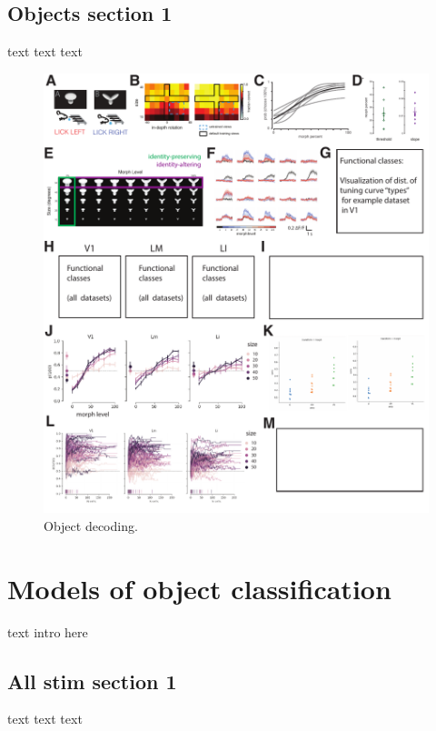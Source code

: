 \documentclass{article}
\begin{document}
\subsection{Objects section 1}
text text text

\begin{figure}[ht]
  \includegraphics[width=\textwidth]{figures/objects.pdf}
  \caption{Object decoding.}
  \label{fig:fig4}
\end{figure}

\section{Models of object classification}
text intro here

\subsection{All stim section 1}
text text text
\end{document}
